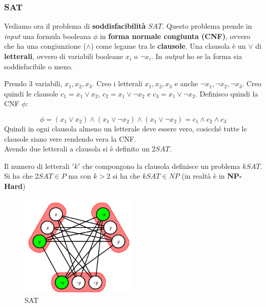 			\subsubsection{SAT}
			\begin{definizione}
				Vediamo ora il problema di \textbf{soddisfacibilità} $SAT$. Questo problema
				prende in \textit{input} una formula booleana $\phi$ in \textbf{forma normale congiunta
					(CNF)}, ovvero che ha una congiunzione ($\land$) come legame tra le
				\textbf{clausole}. Una clausola è un $\lor$ di \textbf{letterali}, ovvero di
				variabili booleane $x_i$ o $\neg x_i$. In \textit{output} ho se la forma sia
				soddisfacibile o meno. 
				\begin{esempio}
					Prendo 3 variabili, $x_1,x_2,x_3$. Creo i letterali  $x_1,x_2,x_3$ e anche
					$\neg x_1,\neg x_2,\neg x_3$. Creo quindi le clausole $c_1=x_1\lor x_2$,
					$c_2=x_1\lor \neg x_2$ e $c_3=x_1\lor \neg x_2$. Definisco quindi la CNF
					$\phi$:
					    
					\[\phi=(x_1\lor x_2)\land (x_1\lor \neg x_2)\land
						(x_1\lor \neg x_2)=c_1\land c_2\land c_3\]
						Quindi in ogni clausola almeno un letterale deve essere vero, cosicché tutte
						le clausole siano vere rendendo vera la CNF.\\
						Avendo due letterali a clausola si è definito un $2SAT$.
						\end{esempio}
						Il numero di letterali $ 'k' $ che compongono la clausola definisce un problema
						$kSAT$. Si ha che $2SAT\in P$ ma con $k>2$ si ha che $kSAT\in NP$ (in
						realtà è in \textbf{NP-Hard})
						\end{definizione}
						\begin{figure}[h!]
							\centering
							\includegraphics[width=0.5\textwidth]{img/300px-Sat_reduced_to_Clique_from_Sipser.svg.png}
							\caption{SAT}
							\label{fig:SAT}
						\end{figure}
